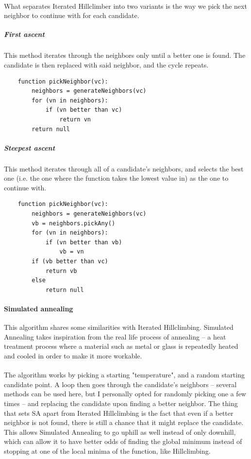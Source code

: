 \documentclass{article}
\begin{document}
    \paragraph{}
    What separates Iterated Hillclimber into two variants is the way we pick the next neighbor to continue with for each candidate.
    \subparagraph{First ascent} 
    This method iterates through the neighbors only until a better one is found. The candidate is then replaced with said neighbor, and the cycle repeats.
    \begin{verbatim}
    function pickNeighbor(vc): 
        neighbors = generateNeighbors(vc)
        for (vn in neighbors):
            if (vn better than vc)
                return vn
        return null
    \end{verbatim}
    \subparagraph{Steepest ascent}
    This method iterates through all of a candidate's neighbors, and selects the best one (i.e. the one where the function takes the lowest value in) as the one to continue with.
    \begin{verbatim}
    function pickNeighbor(vc):
        neighbors = generateNeighbors(vc)
        vb = neighbors.pickAny()
        for (vn in neighbors):
            if (vn better than vb)
                vb = vn
        if (vb better than vc)
            return vb
        else
            return null
    \end{verbatim}

    \paragraph{Simulated annealing}
    This algorithm shares some similarities with Iterated Hillclimbing. Simulated Annealing takes inspiration from the real life process of annealing -- a heat treatment process where a material such as metal or glass is repeatedly heated and cooled in order to make it more workable. 
    \paragraph{}
    The algorithm works by picking a starting "temperature", and a random starting candidate point. A loop then goes through the candidate's neighbors -- several methods can be used here, but I personally opted for randomly picking one a few times -- and replacing the candidate upon finding a better neighbor. The thing that sets SA apart from Iterated Hillclimbing is the fact that even if a better neighbor is not found, there is still a chance that it might replace the candidate. This allows Simulated Annealing to go uphill as well instead of only downhill, which can allow it to have better odds of finding the global minimum instead of stopping at one of the local minima of the function, like Hillclimbing.
\end{document}
